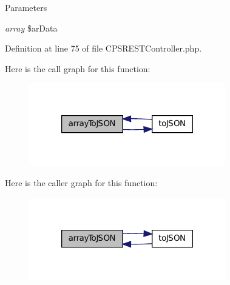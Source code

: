 \begin{DoxyParams}{Parameters}
\item[{\em array}]\$arData \end{DoxyParams}


Definition at line 75 of file CPSRESTController.php.








Here is the call graph for this function:\nopagebreak
\begin{figure}[H]
\begin{center}
\leavevmode
\includegraphics[width=242pt]{classCPSRESTController_af9f23d22326ba3616718f2160c36c066_cgraph}
\end{center}
\end{figure}




Here is the caller graph for this function:\nopagebreak
\begin{figure}[H]
\begin{center}
\leavevmode
\includegraphics[width=242pt]{classCPSRESTController_af9f23d22326ba3616718f2160c36c066_icgraph}
\end{center}
\end{figure}


